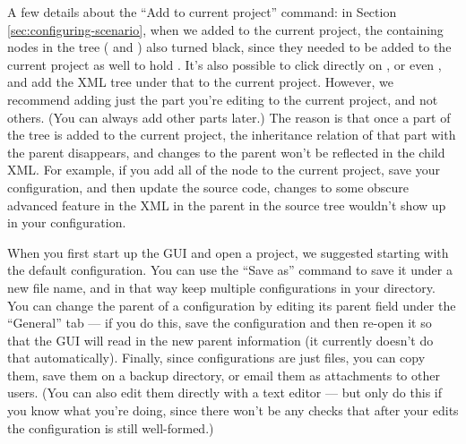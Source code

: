 A few details about the ``Add to current project'' command: in Section
\ref{sec:configuring-scenario}, when we added  to the
current project, the containing nodes in the tree ( and
) also turned black, since they needed to be added to
the current project as well to hold .  It's also possible to
click directly on , or even , and
add the XML tree under that to the current project.  However, we recommend
adding just the part you're editing to the current project, and not others.
(You can always add other parts later.)  The reason is that once a part of
the tree is added to the current project, the inheritance relation of that
part with the parent disappears, and changes to the parent won't be
reflected in the child XML\@.  For example, if you add all of the
 node to the current project, save your
configuration, and then update the source code, changes to some obscure
advanced feature in the XML in the parent in the source tree wouldn't show
up in your configuration.

When you first start up the GUI and open a project, we suggested starting
with the default  configuration.  You can use the
``Save as'' command to save it under a new file name, and in that way keep
multiple configurations in your  directory.  You
can change the parent of a configuration by editing its parent field under
the ``General'' tab --- if you do this, save the configuration and then
re-open it so that the GUI will read in the new parent information (it
currently doesn't do that automatically).  Finally, since configurations
are just files, you can copy them, save them on a backup directory, or
email them as attachments to other users.  (You can also edit them directly
with a text editor --- but only do this if you know what you're doing,
since there won't be any checks that after your edits the configuration is
still well-formed.)

